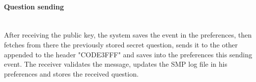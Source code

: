 \paragraph{Question sending} \hspace{0pt} \\
After receiving the public key, the system saves the event in the preferences, then fetches from there the previously stored secret question, sends it to the other appended to the header "CODE3FFF" and saves into the preferences this sending event. The receiver validates the message, updates the SMP log file in his preferences and stores the received question.